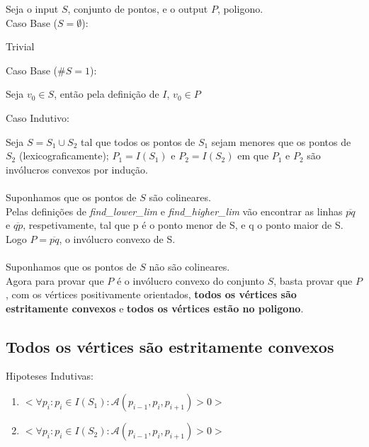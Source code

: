 \documentclass[11pt]{article}
\begin{document}
Seja o input $S$, conjunto de pontos, e o output $P$, poligono.\\
Caso Base ($S = \emptyset$):\par
\hfill\begin{minipage}{\dimexpr\textwidth-1cm}
    Trivial\\
\end{minipage}
Caso Base ($\#S = 1$):\par
\hfill\begin{minipage}{\dimexpr\textwidth-1cm}
    Seja $v_0 \in S$, então pela definição de $I$, $v_0 \in P$\\
\end{minipage}
Caso Indutivo:\par
\hfill\begin{minipage}{\dimexpr\textwidth-1cm}
    Seja $S = S_1 \cup S_2$ tal que todos os pontos de $S_1$
    sejam menores que os pontos de $S_2$ (lexicograficamente); 
    $P_1 = I(S_1)$ e $P_2 = I(S_2)$ em que $P_1$ e $P_2$ são 
    invólucros convexos por indução.\\\\
    
    Suponhamos que os pontos de $S$ são colineares.\\
    Pelas definições de \textit{find\_lower\_lim} e 
    \textit{find\_higher\_lim} vão encontrar as linhas 
    $\overline{p q}$ e $\overline{q p}$, respetivamente,
    tal que p é o ponto menor de S, e q o ponto maior de S. 
    Logo $P = \overline{p q}$, o invólucro convexo de S.\\\\

    Suponhamos que os pontos de $S$ não são colineares.\\
    Agora para provar que $P$ é o invólucro convexo
    do conjunto $S$, basta provar que $P$, com os vértices 
    positivamente orientados, \textbf{todos os vértices 
    são estritamente convexos} e \textbf{todos os vértices 
    estão no poligono}.\\
    
    
    
\end{minipage}

\subsection{Todos os vértices são estritamente convexos}

Hipoteses Indutivas:
\begin{enumerate}
    \item $< \forall p_i : p_i \in I(S_1) : \mathcal{A}(p_{i-1}, p_i, p_{i+1}) > 0 >$
    \item $< \forall p_i : p_i \in I(S_2) : \mathcal{A}(p_{i-1}, p_i, p_{i+1}) > 0 >$
\end{enumerate}
\end{document}

